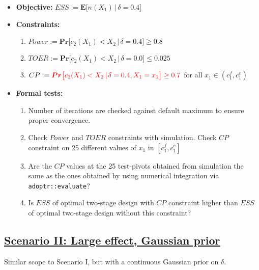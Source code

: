 \documentclass[]{book}
\providecommand{\tightlist}{%
  \setlength{\itemsep}{0pt}\setlength{\parskip}{0pt}}
\begin{document}
\begin{itemize}
\tightlist
\item
  \textbf{Objective:} \(ESS := \boldsymbol{E}\big[n(X_1)\,|\,\delta=0.4\big]\)
\item
  \textbf{Constraints:}

  \begin{enumerate}
  \def\labelenumi{\arabic{enumi}.}
  \tightlist
  \item
    \(Power := \boldsymbol{Pr}\big[c_2(X_1) < X_2\,|\,\delta=0.4\big] \geq 0.8\)
  \item
    \(TOER := \boldsymbol{Pr}\big[c_2(X_1) < X_2\,|\,\delta=0.0\big] \leq 0.025\)
  \item
    \(CP := \color{red}{\boldsymbol{Pr}\big[c_2(X_1) < X_2\,|\,\delta=0.4, X_1 = x_1\big] \geq 0.7}\) for all \(x_1\in(c_1^f, c_1^e)\)
  \end{enumerate}
\item
  \textbf{Formal tests:}

  \begin{enumerate}
  \def\labelenumi{\arabic{enumi}.}
  \tightlist
  \item
    Number of iterations are checked against default maximum to ensure proper
    convergence.
  \item
    Check \(Power\) and \(TOER\) constraints with simulation.
    Check \(CP\) constraint on 25 different values of \(x_1\) in
    \([c_1^f, c_1^e]\)
  \item
    Are the \(CP\) values at the 25 test-pivots obtained from simulation the
    same as the ones obtained by using numerical integration via
    \texttt{adoptr::evaluate}?
  \item
    Is \(ESS\) of optimal two-stage design with \(CP\) constraint higher than
    \(ESS\) of optimal two-stage design without this constraint?
  \end{enumerate}
\end{itemize}

\hypertarget{scenario-ii-large-effect-gaussian-prior}{%
\subsection{\texorpdfstring{\protect\hyperlink{scenarioII}{Scenario II: Large effect, Gaussian prior}}{Scenario II: Large effect, Gaussian prior}}\label{scenario-ii-large-effect-gaussian-prior}}

Similar scope to Scenario I, but with a continuous Gaussian prior on \(\delta\).
\end{document}
